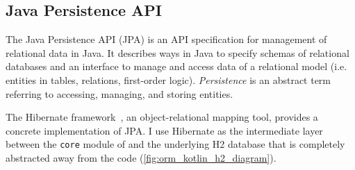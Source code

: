 \subsection{Java Persistence API}

The Java Persistence API\cite{BiswasJavaPersistenceAPI2016} (JPA) is an API specification for management of relational data in Java.
It describes ways in Java to specify schemas of relational databases and an interface to manage and access data of a relational model (i.e. entities in tables, relations, first-order logic).
\textsl{Persistence} is an abstract term referring to accessing, managing, and storing entities.

The Hibernate framework~\cite{ElliottHibernateDeveloperNotebook2004,BauerJavaPersistenceHibernate2015}, an object-relational mapping tool, provides a concrete implementation of JPA.
I use Hibernate as the intermediate layer between the \texttt{core} module of \graffs and the underlying H2 database that is completely abstracted away from the \graffs code (\autoref{fig:orm_kotlin_h2_diagram}).






